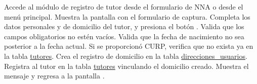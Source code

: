 \begin{UCtrayectoria}
	\UCpaso[\UCactor] Accede al módulo de registro de tutor desde el formulario de NNA o desde el menú principal.
	\UCpaso Muestra la pantalla  con el formulario de captura.
	\UCpaso[\UCactor] \label{CU-18.ingresaDatos} Completa los datos personales y de domicilio del tutor, y presiona el botón .
	\UCpaso Valida que los campos obligatorios no estén vacíos. 
	\UCpaso Valida que la fecha de nacimiento no sea posterior a la fecha actual. 
	\UCpaso Si se proporcionó CURP, verifica que no exista ya en la tabla \hyperlink{Tutores}{tutores}. 
	\UCpaso Crea el registro de domicilio en la tabla \hyperlink{Direcciones}{direcciones\_usuarios}.
	\UCpaso Registra al tutor en la tabla \hyperlink{Tutores}{tutores} vinculando el domicilio creado.
	\UCpaso Muestra el mensaje  y regresa a la pantalla .
\end{UCtrayectoria}


